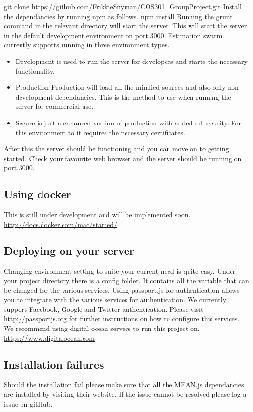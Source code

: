 git clone \url{https://github.com/FrikkieSnyman/COS301_GroupProject.git}
\newline
Install the dependancies by running npm as follows.
\newline
npm install
\newline
Running the grunt command in the relevant directory will start the server. This will start the server in the default development environment on port 3000. Estimation swarm currently supports running in three environment types.
\begin{itemize}
	\item{Development} is used to run the server for developers and starts the necessary functionality.
	\item{Production}
	Production will load all the minified sources and also only non development dependancies. This is the method to use when running the server for commercial use.
	\item{Secure} is just a enhanced version of production with added ssl security. For this environment to it requires the necessary certificates.
\end{itemize}
After this the server should be functioning and you can move on to getting started. Check your favourite web browser and the server should be running on port 3000.
\subsection{Using docker}
This is still under development and will be implemented soon.
\url{http://docs.docker.com/mac/started/}
\subsection{Deploying on your server}
Changing environment setting to suite your current need is quite easy. Under your project directory there is a config folder. It contains all the variable that can be changed for the various services. Using passport.js for authentication allows you to integrate with the various services for authentication. We currently support Facebook, Google and Twitter authentication. Please visit \url{http://passportjs.org} for further instructions on how to configure this services. We recommend using digital ocean servers to run this project on. \url{https://www.digitalocean.com}

\subsection{Installation failures}
Should the installation fail please make sure that all the MEAN.js dependancies are installed by visiting their website. If the issue cannot be resolved please log a issue on gitHub.